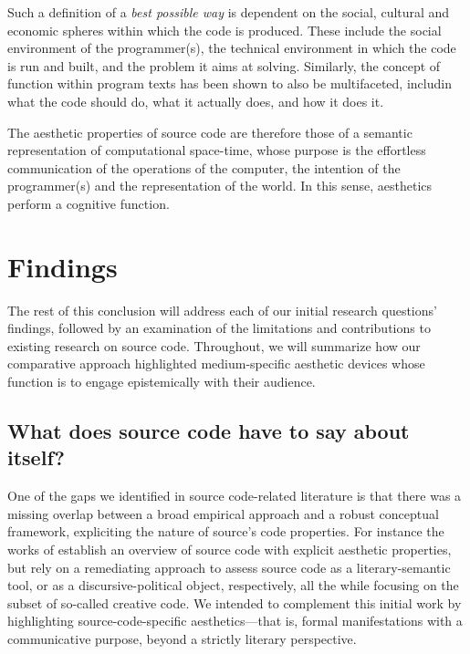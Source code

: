 Such a definition of a \emph{best possible way} is dependent on the social, cultural and economic spheres within which the code is produced. These include the social environment of the programmer(s), the technical environment in which the code is run and built, and the problem it aims at solving. Similarly, the concept of function within program texts has been shown to also be multifaceted, includin what the code should do, what it actually does, and how it does it.

The aesthetic properties of source code are therefore those of a semantic representation of computational space-time, whose purpose is the effortless communication of the operations of the computer, the intention of the programmer(s) and the representation of the world. In this sense, aesthetics perform a cognitive function.

\section{Findings}
\label{sec:findings}

The rest of this conclusion will address each of our initial research questions' findings, followed by an examination of the limitations and contributions to existing research on source code. Throughout, we will summarize how our comparative approach highlighted medium-specific aesthetic devices whose function is to engage epistemically with their audience.

\subsection*{What does source code have to say about itself?}
\label{subsec:conclusion-rq-1}

One of the gaps we identified in source code-related literature is that there was a missing overlap between a broad empirical approach and a robust conceptual framework, expliciting the nature of source's code properties. For instance the works of \citep{paloque-berges_poetique_2009,cox_speaking_2013,black_art_2002} establish an overview of source code with explicit aesthetic properties, but rely on a remediating approach to assess source code as a literary-semantic tool, or as a discursive-political object, respectively, all the while focusing on the subset of so-called creative code. We intended to complement this initial work by highlighting source-code-specific aesthetics—that is, formal manifestations with a communicative purpose, beyond a strictly literary perspective.

